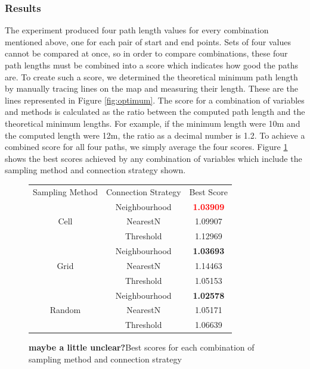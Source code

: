 \documentclass[conference]{IEEEtran}
\begin{document}
\subsubsection{Results}
The experiment produced four path length values for every combination mentioned above, one for each pair of start and end points. Sets of four values cannot be compared at once, so in order to compare combinations, these four path lengths must be combined into a score which indicates how good the paths are. To create such a score, we determined the theoretical minimum path length by manually tracing lines on the map and measuring their length. These are the lines represented in Figure \ref{fig:optimum}. The score for a combination of variables and methods is calculated as the ratio between the computed path length and the theoretical minimum lengths. For example, if the minimum length were 10m and the computed length were 12m, the ratio as a decimal number is 1.2. To achieve a combined score for all four paths, we simply average the four scores. Figure \ref{fig:sampleconntable} shows the best scores achieved by any combination of variables which include the sampling method and connection strategy shown.

\begin{figure}
  \centering
  \begin{tabular}{|c|c|c|}
    \cline{1-3}
    Sampling Method & Connection Strategy & Best Score      \\ \cline{1-3}
    \multirow{3}{*}{Cell} & Neighbourhood & \textbf{\textcolor{red}{1.03909}}         \\ \cline{2-3}
    & NearestN  & 1.09907                                     \\ \cline{2-3}
    & Threshold & 1.12969                                       \\ \cline{1-3}
    \multirow{3}{*}{Grid} & Neighbourhood & \textbf{1.03693}                          \\ \cline{2-3}
    & NearestN & 1.14463                                        \\ \cline{2-3}
    & Threshold & 1.05153                                       \\ \cline{1-3}
    \multirow{3}{*}{Random} & Neighbourhood & \textbf{1.02578}                        \\ \cline{2-3}
    & NearestN & 1.05171                                      \\ \cline{2-3}
    & Threshold & 1.06639                                     \\ \cline{1-3}
 \end{tabular}
  \caption{\textbf{maybe a little unclear?}Best scores for each combination of sampling method and connection strategy}
  \label{fig:sampleconntable}
\end{figure}
\end{document}
